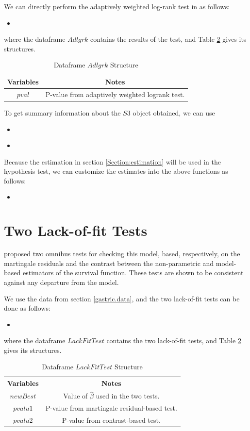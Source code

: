\documentclass[12pt]{article}
\newcommand{\insertcode}[2]{\begin{itemize}\item[]\end{itemize}} %
\begin{document}
We can directly perform the adaptively weighted log-rank test in \cite{yang2009improved} as follows:
\insertcode{"Scripts/code18.pl"}{Performing the adaptively weighted log-rank test.}
where the dataframe $Adlgrk$ contains the results of the test, and Table \ref{Tab:IntervalBandsStructure} gives its structures.

\begin{table}[!h]
\renewcommand{\arraystretch}{1.3}
\caption{Dataframe $Adlgrk$ Structure} \label{Tab:AdlgrkStructure} \centering
\begin{tabular}{|c||c|}
  \hline
  Variables & Notes  \\
  \hline
  $pval$ & P-value from adaptively weighted logrank test. \\
  \hline
\end{tabular}
\end{table}

To get summary information about the $S3$ object obtained, we can use

\insertcode{"Scripts/code19.pl"}{Summarizing results of the adaptively weighted logrank test.}
\insertcode{"Scripts/result19.pl"}{Results of scripts.}

Because the estimation in section \ref{Section:estimation} will be used in the hypothesis test, we can customize the estimates into the above functions as follows:
\insertcode{"Scripts/code18 - 2.pl"}{Performing confidence intervals and bands estimation with customized estimates.}

\section{Two Lack-of-fit Tests}\label{Section.LacTest}
\cite{yang2012checking} proposed two omnibus tests for checking this
model, based, respectively, on the martingale residuals and the contrast between
the non-parametric and model-based estimators of the survival function.
These tests are shown to be consistent against any departure from the
model.

We use the data from section \ref{gastric.data}, and the two lack-of-fit tests can be done as follows:
\insertcode{"Scripts/code22.pl"}{Performing the two lack-of-fit tests.}
where the dataframe $LackFitTest$ contains the two lack-of-fit tests, and Table \ref{Tab:IntervalBandsStructure} gives its structures.

\begin{table}[!h]
\renewcommand{\arraystretch}{1.3}
\caption{Dataframe $LackFitTest$ Structure} \label{Tab:IntervalBandsStructure} \centering
\begin{tabular}{|c||c|}
  \hline
  Variables & Notes  \\
  \hline
  $newBest$ & Value of $\hat{\beta}$ used in the two tests.\\
  $pvalu1$ & P-value from martingale residual-based test. \\
  $pvalu2$ & P-value from contrast-based test. \\
  \hline
\end{tabular}
\end{table}
\end{document}
